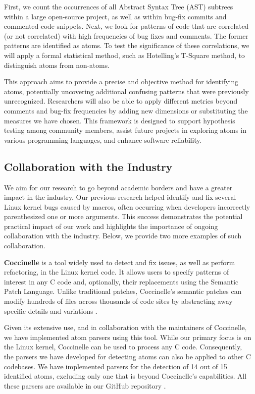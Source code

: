 \documentclass[conference]{IEEEtran}
\begin{document}
First, we count the occurrences of all Abstract Syntax Tree 
(AST) subtrees within a large open-source project, as well as 
within bug-fix commits and commented code snippets. Next, we 
look for patterns of code that are correlated (or not 
correlated) with high frequencies of bug fixes and comments. 
The former patterns are identified as atoms. To test the 
significance of these correlations, we will apply a formal 
statistical method, such as Hotelling’s T-Square method, to 
distinguish atoms from non-atoms.

This approach aims to provide a precise and objective method 
for identifying atoms, potentially uncovering additional 
confusing patterns that were previously unrecognized. 
Researchers will also be able to apply different metrics 
beyond comments and bug-fix frequencies by adding new 
dimensions or substituting the measures we have chosen. This 
framework is designed to support hypothesis testing among 
community members, assist future projects in exploring atoms 
in various programming languages, and enhance software 
reliability.


\subsection{Collaboration with the Industry}

We aim for our research to go beyond academic borders and have 
a greater impact in the industry. Our previous research helped 
identify and fix several Linux kernel bugs caused by macros, 
often occurring when developers incorrectly parenthesized one 
or more arguments. This success demonstrates the potential 
practical impact of our work and highlights the importance of 
ongoing collaboration with the industry. Below, we provide two 
more examples of such collaboration.

\textbf{Coccinelle} is a tool widely used to detect and fix issues,
as well as perform refactoring, in the Linux kernel code.
It allows users to specify patterns of interest in any C code and,
optionally, their replacements using the Semantic Patch Language.
Unlike traditional patches, Coccinelle's semantic patches can modify hundreds
of files across thousands of code sites by abstracting away specific details
and variations \cite{coccinelle}.

Given its extensive use, and in collaboration with the 
maintainers of Coccinelle, we have implemented atom parsers 
using this tool. While our primary focus is on the Linux 
kernel, Coccinelle can be used to process any C code. 
Consequently, the parsers we have developed for detecting 
atoms can also be applied to other C codebases. We have 
implemented parsers for the detection of 14 out of 15 
identified atoms, excluding only one that is beyond 
Coccinelle's capabilities. All these parsers are available in 
our GitHub repository \cite{githubcocci}.
\end{document}
